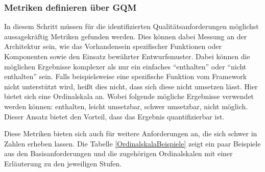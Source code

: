 \subsubsection{Metriken definieren über \ac*{GQM}}

In diesem Schritt müssen für die identifizierten Qualitätsanforderungen möglichst aussagekräftig Metriken gefunden werden. Dies können dabei Messung an der Architektur sein, wie das Vorhandensein spezifischer Funktionen oder Komponenten sowie den Einsatz bewährter Entwurfsmuster. Dabei können die möglichen Ergebnisse komplexer als nur ein einfaches \enquote{enthalten} oder \enquote{nicht enthalten} sein. Falls beispielsweise eine spezifische Funktion vom Framework nicht unterstützt wird, heißt dies nicht, dass sich diese nicht umsetzen lässt. Hier bietet sich eine Ordinalskala an. Wobei folgende mögliche Ergebnisse verwendet werden können: enthalten, leicht umsetzbar, schwer umsetzbar, nicht möglich. Dieser Ansatz bietet den Vorteil, dass das Ergebnis quantifizierbar ist.

Diese Metriken bieten sich auch für weitere Anforderungen an, die sich schwer in Zahlen erheben lassen. Die Tabelle \ref{OrdinalskalaBeispiele} zeigt ein paar Beispiele aus den Basisanforderungen und die zugehörigen Ordinalskalen mit einer Erläuterung zu den jeweiligen Stufen.

